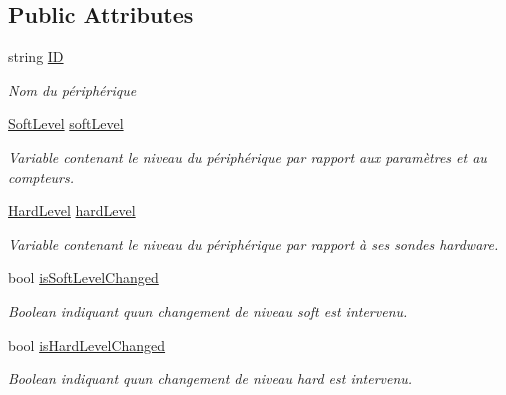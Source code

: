 \subsection*{Public Attributes}
\begin{DoxyCompactItemize}
\item 
string \mbox{\hyperlink{class_device_library_1_1_c_device_1_1_c_level_ab6b7169c06236f3fa61759868d710d60}{ID}}
\begin{DoxyCompactList}\small\item\em Nom du périphérique \end{DoxyCompactList}\item 
\mbox{\hyperlink{class_device_library_1_1_c_device_1_1_c_level_a83c2976bc299331f1c355e806299bb1f}{Soft\+Level}} \mbox{\hyperlink{class_device_library_1_1_c_device_1_1_c_level_ab128a2dee79a09876ed3564ac6e67ad8}{soft\+Level}}
\begin{DoxyCompactList}\small\item\em Variable contenant le niveau du périphérique par rapport aux paramètres et au compteurs. \end{DoxyCompactList}\item 
\mbox{\hyperlink{class_device_library_1_1_c_device_1_1_c_level_a3f3169da53d5beebdac25e401982101a}{Hard\+Level}} \mbox{\hyperlink{class_device_library_1_1_c_device_1_1_c_level_ad1e4887c141b007c70d3dd0faa3a2d17}{hard\+Level}}
\begin{DoxyCompactList}\small\item\em Variable contenant le niveau du périphérique par rapport à ses sondes hardware. \end{DoxyCompactList}\item 
bool \mbox{\hyperlink{class_device_library_1_1_c_device_1_1_c_level_adf6dfbab08598ddbd0c0c104f611a967}{is\+Soft\+Level\+Changed}}
\begin{DoxyCompactList}\small\item\em Boolean indiquant qu\textquotesingle{}un changement de niveau soft est intervenu. \end{DoxyCompactList}\item 
bool \mbox{\hyperlink{class_device_library_1_1_c_device_1_1_c_level_ae97fdf02d066a9a755d964e708e996c6}{is\+Hard\+Level\+Changed}}
\begin{DoxyCompactList}\small\item\em Boolean indiquant qu\textquotesingle{}un changement de niveau hard est intervenu. \end{DoxyCompactList}\end{DoxyCompactItemize}


